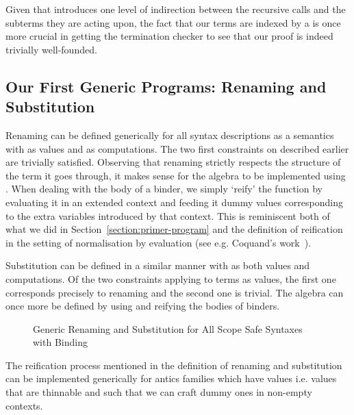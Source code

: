 Given that  introduces one level of indirection between the
recursive calls and the subterms they are acting upon, the fact
that our terms are indexed by a  is once more crucial in
getting the termination checker to see that our proof is indeed
trivially well-founded.

\subsection{Our First Generic Programs: Renaming and Substitution}

Renaming can be defined generically for all syntax descriptions as a
semantics with  as values and  as computations. The
two first constraints on  described earlier are trivially
satisfied. Observing that renaming strictly respects the structure of the
term it goes through, it makes sense for the algebra to be implemented using .
When dealing with the body of a binder, we simply `reify' the
 function by evaluating it in an extended context and
feeding it dummy values corresponding to the extra variables
introduced by that context. This is reminiscent both of what we
did in Section~\ref{section:primer-program} and the definition
of reification in the setting of normalisation by evaluation
(see e.g. Coquand's work~\citeyear{coquand2002formalised}).

Substitution can be defined in a similar manner with  as both
values and computations. Of the two constraints applying to terms as
values, the first one corresponds precisely to renaming and the second
one is trivial. The algebra can once more be defined by using 
and reifying the bodies of binders.

\begin{figure}[h]
\begin{minipage}{0.45\textwidth}
\end{minipage}\hspace{2em}
\begin{minipage}{0.45\textwidth}
\end{minipage}
\caption{Generic Renaming and Substitution for All Scope Safe Syntaxes with Binding}
\end{figure}

The reification process mentioned in the definition of renaming
and substitution can be implemented generically for antics
families which have  values i.e. values that are thinnable
and such that we can craft dummy ones in non-empty contexts.

